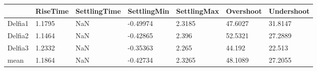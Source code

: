 \begin{tabular}{lllllll}
& RiseTime & SettlingTime & SettlingMin & SettlingMax & Overshoot & Undershoot \\ 
\hline 
Delfia1 & 1.1795 & NaN & -0.49974 & 2.3185 & 47.6027 & 31.8147 \\ 
Delfia2 & 1.1464 & NaN & -0.42865 & 2.396 & 52.5321 & 27.2889 \\ 
Delfia3 & 1.2332 & NaN & -0.35363 & 2.265 & 44.192 & 22.513 \\ 
mean & 1.1864 & NaN & -0.42734 & 2.3265 & 48.1089 & 27.2055 \\ 
\hline 
\end{tabular}